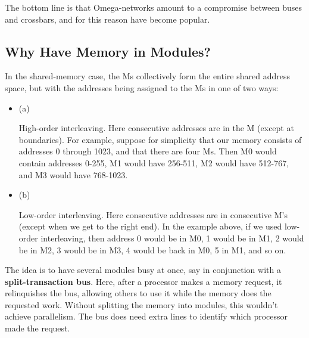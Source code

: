 The bottom line is that Omega-networks amount to a compromise between
buses and crossbars, and for this reason have become popular.

\subsection{Why Have Memory in Modules?}

In the shared-memory case, the Ms collectively form the entire
shared address space, but with the addresses being assigned to the Ms in
one of two ways:

\begin{itemize}

\item (a)

High-order interleaving. Here consecutive addresses are in the
 M (except at boundaries). For example, suppose for
simplicity that our memory consists of addresses 0 through 1023, and
that there are four Ms.  Then M0 would contain addresses 0-255, M1 would
have 256-511, M2 would have 512-767, and M3 would have 768-1023.

\item (b)

Low-order interleaving. Here consecutive addresses are in consecutive
M's (except when we get to the right end). In the example above, if we
used low-order interleaving, then address 0 would be in M0, 1 would be
in M1, 2 would be in M2, 3 would be in M3, 4 would be back in M0, 5 in
M1, and so on.

\end{itemize}

The idea is to have several modules busy at once, say in conjunction
with a {\bf split-transaction bus}.  Here, after a processor makes a
memory request, it relinquishes the bus, allowing others to use it while
the memory does the requested work.  Without splitting the memory into
modules, this wouldn't achieve parallelism.  The bus does need extra
lines to identify which processor made the request.

